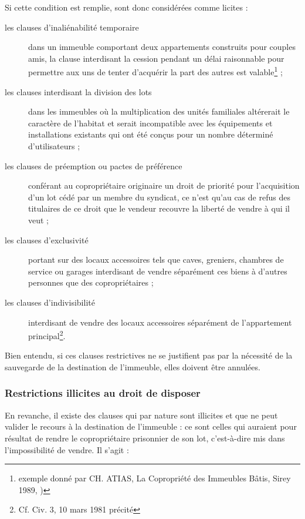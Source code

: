 			Si cette condition est remplie, sont donc considérées comme licites :
			\begin{description}
				\item[les clauses d'inaliénabilité temporaire] dans un immeuble comportant deux
				appartements construits pour couples amis, la clause interdisant la cession pendant un
				délai raisonnable pour permettre aux uns de tenter d'acquérir la part des autres est
				valable\footnote{exemple donné par CH. ATIAS, La Copropriété des Immeubles Bâtis, Sirey 1989,				)} ;
				
				\item[les clauses interdisant la division des lots] dans les immeubles où la multiplication des
				unités familiales altérerait le caractère de l'habitat et serait incompatible avec les
				équipements et installations existants qui ont été conçus pour un nombre déterminé
				d'utilisateurs ;
				
				\item[les clauses de préemption ou pactes de préférence] conférant au copropriétaire originaire
				un droit de priorité pour l'acquisition d'un lot cédé par un membre du syndicat, ce n'est
				qu'au cas de refus des titulaires de ce droit que le vendeur recouvre la liberté de vendre à
				qui il veut ;
				
				\item[les clauses d'exclusivité] portant sur des locaux accessoires tels que caves, greniers,
				chambres de service ou garages interdisant de vendre séparément ces biens à d'autres
				personnes que des copropriétaires ;
				
				\item[les clauses d'indivisibilité] interdisant de vendre des locaux accessoires séparément de
				l'appartement principal\footnote{Cf. Civ. 3\ieme{}, 10 mars 1981 précité}.
			\end{description}
			
			Bien entendu, si ces clauses restrictives ne se justifient pas par la nécessité de la
			sauvegarde de la destination de l'immeuble, elles doivent être annulées.
			
		\subsubsection{Restrictions illicites au droit de disposer}
		
			En revanche, il existe des clauses qui par nature sont illicites et que ne peut valider le
			recours à la destination de l'immeuble : ce sont celles qui auraient pour résultat de rendre
			le copropriétaire prisonnier de son lot, c'est-à-dire mis dans l'impossibilité de vendre. Il
			s'agit :
			

